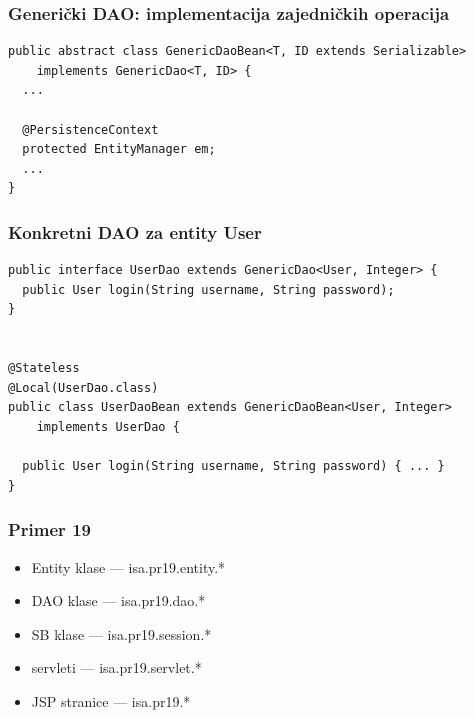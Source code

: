 \documentclass[compress]{beamer}
\begin{document}
\begin{frame}[fragile,shrink=10]
  \frametitle{Generički DAO: implementacija zajedničkih operacija}
\begin{verbatim}
public abstract class GenericDaoBean<T, ID extends Serializable> 
    implements GenericDao<T, ID> {
  ...
  
  @PersistenceContext
  protected EntityManager em;
  ...
}
\end{verbatim}
\end{frame}
\begin{frame}[fragile,shrink=10]
  \frametitle{Konkretni DAO za entity User}
\begin{verbatim}
public interface UserDao extends GenericDao<User, Integer> {
  public User login(String username, String password);
}


@Stateless
@Local(UserDao.class)
public class UserDaoBean extends GenericDaoBean<User, Integer> 
    implements UserDao {

  public User login(String username, String password) { ... }
}
\end{verbatim}
\end{frame}
\begin{frame}
  \frametitle{Primer 19}
  \begin{itemize}
    \item Entity klase --- isa.pr19.entity.*
    \item DAO klase --- isa.pr19.dao.*
    \item SB klase --- isa.pr19.session.*
    \item servleti --- isa.pr19.servlet.*
    \item JSP stranice --- isa.pr19.*
  \end{itemize}
\end{frame}
\end{document}
